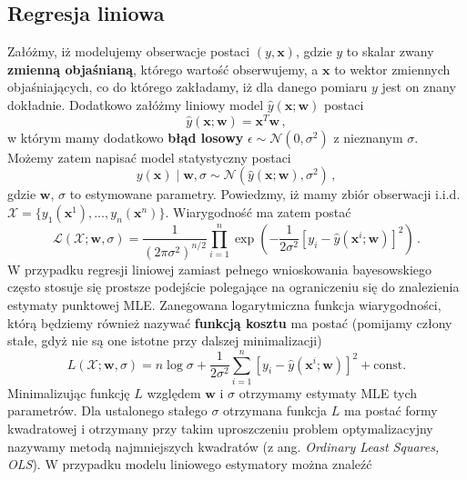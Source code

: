\documentclass{myclass}
\numberwithin{equation}{subsection}
\begin{document}
\subsection{Regresja liniowa}

Załóżmy, iż modelujemy obserwacje postaci \((y, \mathbf{x})\), gdzie \(y\) to skalar zwany
\textbf{zmienną objaśnianą}, którego wartość obserwujemy, a \(\mathbf{x}\) to wektor zmiennych
objaśniających, co do którego zakładamy, iż dla danego pomiaru \(y\) jest on znany dokładnie.
Dodatkowo załóżmy liniowy model \(\hat{y}(\mathbf{x};\mathbf{w})\) postaci
\begin{equation}
    \hat{y}(\mathbf{x};\mathbf{w}) = \mathbf{x}^T\mathbf{w}\,,
\end{equation}
w którym mamy dodatkowo \textbf{błąd losowy} \(\epsilon \sim \mathcal{N}(0, \sigma^2)\) z nieznanym
\(\sigma\). Możemy zatem napisać model statystyczny postaci
\begin{equation}
    y(\mathbf{x}) \mid \mathbf{w}, \sigma \sim \mathcal{N}(\hat{y}(\mathbf{x}; \mathbf{w}), \sigma^2)\,,
\end{equation}
gdzie \(\mathbf{w}\), \(\sigma\) to estymowane parametry. Powiedzmy, iż mamy zbiór obserwacji i.i.d.
\(\mathcal{X} = \{y_1(\mathbf{x}^1), \ldots, y_n(\mathbf{x}^n)\}\). Wiarygodność ma zatem postać
\begin{equation}\boxed{
    \mathcal{L}(\mathcal{X} ; \mathbf{w}, \sigma) = \frac{1}{(2\pi\sigma^2)^{n/2}} \prod_{i=1}^n \exp\left(-\frac{1}{2\sigma^2}\left[y_i - \hat{y}(\mathbf{x}^i; \mathbf{w})\right]^2\right)\,.
}\end{equation}
W przypadku regresji liniowej zamiast pełnego wnioskowania bayesowskiego często stosuje się prostsze
podejście polegające na ograniczeniu się do znalezienia estymaty punktowej MLE. Zanegowana
logarytmiczna funkcja wiarygodności, którą będziemy również nazywać \textbf{funkcją kosztu} ma
postać (pomijamy człony stałe, gdyż nie są one istotne przy dalszej minimalizacji)
\begin{equation}\boxed{
    L(\mathcal{X}; \mathbf{w}, \sigma) = n\log\sigma + \frac{1}{2\sigma^2}\sum_{i=1}^n \left[y_i - \hat{y}(\mathbf{x}^i; \mathbf{w})\right]^2 + \mathrm{const.}
}\end{equation}
Minimalizując funkcję \(L\) względem \(\mathbf{w}\) i \(\sigma\) otrzymamy estymaty MLE tych
parametrów. Dla ustalonego stałego \(\sigma\) otrzymana funkcja \(L\) ma postać formy kwadratowej i
otrzymany przy takim uproszczeniu problem optymalizacyjny nazywamy metodą najmniejszych kwadratów (z
ang. \textit{Ordinary Least Squares, OLS}). W przypadku modelu liniowego estymatory można znaleźć
\end{document}
